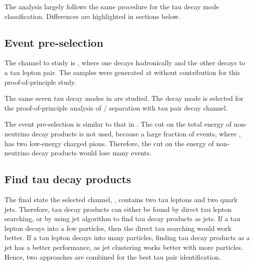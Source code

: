 The analysis largely follows the same procedure for the tau decay mode classification. Differences are highlighted in sections below.



\subsection{Event pre-selection}

The channel to study is \HepProcess{\Pep \Pem \to \PZ \PZ}, where one \PZ decays hadronically and the other \PZ decays to a tau lepton pair. The samples were generated at  without \ISR contribution for this proof-of-principle study.

The same seven tau decay modes in  are studied. The \tauToPion decay mode is selected for the proof-of-principle analysis of \PHiggs / \PZ separation with tau pair decay channel.

The event pre-selection is similar to that in . The cut on the total energy of non-neutrino decay products is not used, because a large fraction of \ZToTauTau events, where \tauToPion, has two low-energy charged pions. Therefore, the cut on the energy of non-neutrino decay products would lose many events.


\subsection{Find tau decay products}
\label{sec:tauHZfindTau}
The final state the selected channel, \eeZZQQ, contains two tau leptons and two quark jets. Therefore, tau decay products can either be found by direct tau lepton searching, or by using jet algorithm to find tau decay products as jets. If a tau lepton decays into a few particles, then the direct tau searching would work better. If a tau lepton decays into many particles, finding tau decay products as a jet has a better performance, as jet clustering works better with more particles. Hence, two approaches are combined for the best tau pair identification.

